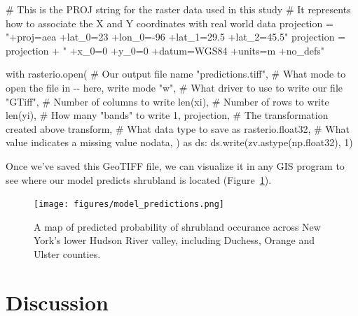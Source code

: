 \documentclass[
  letterpaper,
  DIV=11,
  numbers=noendperiod]{scrartcl}
\newenvironment{Shaded}{\begin{snugshade}}{\end{snugshade}}
\newcommand{\BuiltInTok}[1]{\textcolor[rgb]{0.00,0.23,0.31}{#1}}
\newcommand{\CommentTok}[1]{\textcolor[rgb]{0.37,0.37,0.37}{#1}}
\newcommand{\ControlFlowTok}[1]{\textcolor[rgb]{0.00,0.23,0.31}{#1}}
\newcommand{\DecValTok}[1]{\textcolor[rgb]{0.68,0.00,0.00}{#1}}
\newcommand{\ImportTok}[1]{\textcolor[rgb]{0.00,0.46,0.62}{#1}}
\newcommand{\NormalTok}[1]{\textcolor[rgb]{0.00,0.23,0.31}{#1}}
\newcommand{\OperatorTok}[1]{\textcolor[rgb]{0.37,0.37,0.37}{#1}}
\newcommand{\StringTok}[1]{\textcolor[rgb]{0.13,0.47,0.30}{#1}}
\begin{document}
\begin{Shaded}
\begin{Highlighting}[]
\CommentTok{\# This is the PROJ string for the raster data used in this study}
\CommentTok{\# It represents how to associate the X and Y coordinates with real world data}
\NormalTok{projection }\OperatorTok{=} \StringTok{"+proj=aea +lat\_0=23 +lon\_0={-}96 +lat\_1=29.5 +lat\_2=45.5"}
\NormalTok{projection }\OperatorTok{=}\NormalTok{ projection }\OperatorTok{+} \StringTok{" +x\_0=0 +y\_0=0 +datum=WGS84 +units=m +no\_defs"}

\ControlFlowTok{with}\NormalTok{ rasterio.}\BuiltInTok{open}\NormalTok{(}
    \CommentTok{\# Our output file name}
    \StringTok{"predictions.tiff"}\NormalTok{,}
    \CommentTok{\# What mode to open the file in {-}{-} here, write mode}
    \StringTok{"w"}\NormalTok{,}
    \CommentTok{\# What driver to use to write our file}
    \StringTok{"GTiff"}\NormalTok{,}
    \CommentTok{\# Number of columns to write}
    \BuiltInTok{len}\NormalTok{(xi),}
    \CommentTok{\# Number of rows to write}
    \BuiltInTok{len}\NormalTok{(yi),}
    \CommentTok{\# How many "bands" to write}
    \DecValTok{1}\NormalTok{,}
\NormalTok{    projection,}
    \CommentTok{\# The transformation created above}
\NormalTok{    transform,}
    \CommentTok{\# What data type to save as}
\NormalTok{    rasterio.float32,}
    \CommentTok{\# What value indicates a missing value}
\NormalTok{    nodata,}
\NormalTok{) }\ImportTok{as}\NormalTok{ ds:}
\NormalTok{    ds.write(zv.astype(np.float32), }\DecValTok{1}\NormalTok{)}
\end{Highlighting}
\end{Shaded}

Once we've saved this GeoTIFF file, we can visualize it in any GIS
program to see where our model predicts shrubland is located
(Figure~\ref{fig-predictions}).

\begin{figure}

{\centering 

\texttt{[image: figures/model\_predictions.png]}

}

\caption{\label{fig-predictions}A map of predicted probability of
shrubland occurance across New York's lower Hudson River valley,
including Duchess, Orange and Ulster counties.}

\end{figure}

\hypertarget{sec-discussion}{%
\section{Discussion}\label{sec-discussion}}
\end{document}
